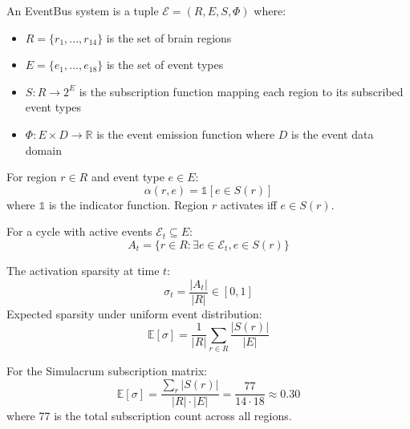 \documentclass[preprint,12pt]{elsarticle}
\newcommand{\R}{\mathbb{R}}
\newcommand{\indicator}{\mathbb{1}}
\begin{document}
\begin{definition}
An EventBus system is a tuple $\mathcal{E} = (R, E, S, \Phi)$ where:
\begin{itemize}
\item $R = \{r_1, ..., r_{14}\}$ is the set of brain regions
\item $E = \{e_1, ..., e_{18}\}$ is the set of event types
\item $S: R \rightarrow 2^E$ is the subscription function mapping each region to its subscribed event types
\item $\Phi: E \times D \rightarrow \R$ is the event emission function where $D$ is the event data domain
\end{itemize}
\end{definition}

\begin{definition}
For region $r \in R$ and event type $e \in E$:
\begin{equation}
\alpha(r, e) = \indicator[e \in S(r)]
\end{equation}
where $\indicator$ is the indicator function. Region $r$ activates iff $e \in S(r)$.
\end{definition}

\begin{definition}
For a cycle with active events $\mathcal{E}_t \subseteq E$:
\begin{equation}
A_t = \{r \in R : \exists e \in \mathcal{E}_t, e \in S(r)\}
\end{equation}
\end{definition}

\begin{definition}
The activation sparsity at time $t$:
\begin{equation}
\sigma_t = \frac{|A_t|}{|R|} \in [0, 1]
\end{equation}
Expected sparsity under uniform event distribution:
\begin{equation}
\mathbb{E}[\sigma] = \frac{1}{|R|} \sum_{r \in R} \frac{|S(r)|}{|E|}
\end{equation}
\end{definition}

\begin{lemma}
For the Simulacrum subscription matrix:
\begin{equation}
\mathbb{E}[\sigma] = \frac{\sum_r |S(r)|}{|R| \cdot |E|} = \frac{77}{14 \cdot 18} \approx 0.30
\end{equation}
where 77 is the total subscription count across all regions.
\end{lemma}
\end{document}
